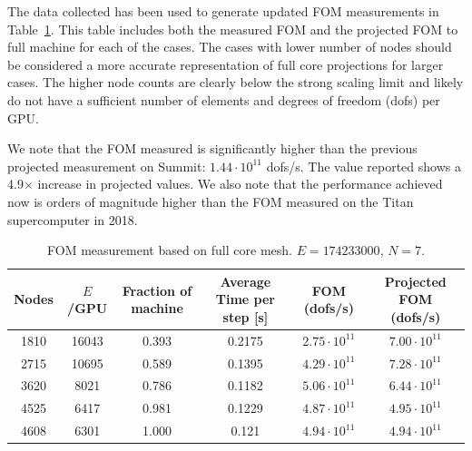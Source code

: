 The data collected has been used to generate updated FOM measurements in Table~\ref{tab:FOM}. This table includes both the measured FOM and the projected FOM to full machine for each of the cases. The cases with lower number of nodes should be considered a more accurate representation of full core projections for larger cases. The higher node counts are clearly below the strong scaling limit and likely do not have a sufficient number of elements and degrees of freedom (dofs) per GPU.

We note that the FOM measured is significantly higher than the previous projected measurement on Summit: $1.44 \cdot 10^{11}$ dofs/s. The value reported shows a 4.9$\times$ increase in projected values. We also note that the performance achieved now is orders of magnitude higher than the FOM measured on the Titan supercomputer in 2018.


 \begin{table} \centering \small
   \begin{tabular}{cccccc} \hline \hline
    Nodes & $E$/GPU & Fraction of machine & Average Time per step [s] & FOM (dofs/s) & Projected FOM (dofs/s) \\ \hline
    1810 & 	16043 & 0.393 &	0.2175  & $2.75 \cdot 10^{11}$ & $7.00 \cdot 10^{11}$ \\
    2715 &	10695 & 0.589 &	0.1395  & $4.29 \cdot 10^{11}$ & $7.28 \cdot 10^{11}$ \\
    3620 &	8021 & 0.786 &	0.1182  & $5.06 \cdot 10^{11}$ & $6.44 \cdot 10^{11}$ \\
    4525 &	6417 & 0.981 &	0.1229  & $4.87 \cdot 10^{11}$ & $4.95 \cdot 10^{11}$ \\
    4608 &	6301 & 1.000 &	0.121   & $4.94 \cdot 10^{11}$ & $4.94 \cdot 10^{11}$ \\
     \hline \hline
  \end{tabular}
   \caption{FOM measurement based on full core mesh. $E=174233000$, $N=7$.}
   \label{tab:FOM}
  \end{table}

